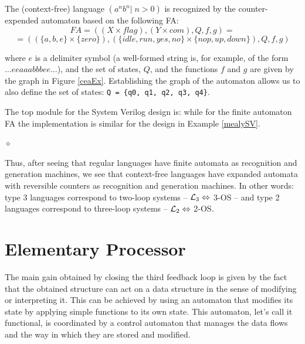 \begin{exemplu}\label{ceaEx}
The (context-free) language $(a^nb^n | \; n>0)$ is recognized by the  counter-expended automaton based on the following FA:
$$FA = ((X \times flag),(Y \times com),Q,f,g) =$$ 
$$= ((\{a,b,e\} \times \{zero\}), (\{idle, run, yes, no\} \times \{nop, up, down\}), Q, f, g)$$

\hspace{-6mm}where $e$ is a delimiter symbol (a well-formed string is, for example, of the form $\ldots eeaaabbbee\ldots$),  and the set of states, $Q$, and the functions $f$ and $g$ are given by the graph in Figure \ref{ceaEx}. Establishing the  graph of the automaton allows us to also define the set of states: {\tt Q = \{q0, q1, q2, q3, q4\}}.



The top module for the System Verilog design is:
{\em
{}
}
\hspace{-6mm}while for the finite automaton FA the implementation is similar for the design in Example \ref{mealySV}.

$\diamond$
\end{exemplu}

Thus, after seeing that regular languages have finite automata as recognition and generation machines, we see that context-free languages have expanded automata with reversible counters as recognition and generation machines. In other words: type 3 languages correspond to two-loop systems -- ${\cal L}_3 \Leftrightarrow$ 3-OS -- and type 2 languages correspond to three-loop systems -- ${\cal L}_2 \Leftrightarrow$ 2-OS.


\section{Elementary Processor}

The main gain obtained by closing the third feedback loop is given by the fact that the obtained structure can act on a data structure in the sense of modifying or interpreting it. This can be achieved by using an automaton that modifies its state by applying simple functions to its own state. This automaton, let's call it functional, is coordinated by a control automaton that manages the data flows and the way in which they are stored and modified.

